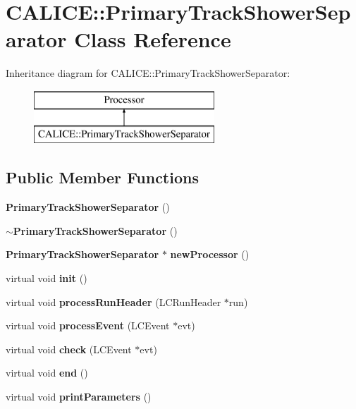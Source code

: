 \section{C\-A\-L\-I\-C\-E\-:\-:Primary\-Track\-Shower\-Separator Class Reference}
\label{classCALICE_1_1PrimaryTrackShowerSeparator}
Inheritance diagram for C\-A\-L\-I\-C\-E\-:\-:Primary\-Track\-Shower\-Separator\-:\begin{figure}[H]
\begin{center}
\leavevmode
\includegraphics[height=2.000000cm]{classCALICE_1_1PrimaryTrackShowerSeparator}
\end{center}
\end{figure}
\subsection*{Public Member Functions}
\begin{DoxyCompactItemize}
\item 
{\bf Primary\-Track\-Shower\-Separator} ()
\item 
{\bf $\sim$\-Primary\-Track\-Shower\-Separator} ()
\item 
{\bf Primary\-Track\-Shower\-Separator} $\ast$ {\bfseries new\-Processor} ()\label{classCALICE_1_1PrimaryTrackShowerSeparator_a0c28aa53521cd9f6306751b9ef2f4a55}

\item 
virtual void {\bfseries init} ()\label{classCALICE_1_1PrimaryTrackShowerSeparator_a3ea401e96f08fddcd03ecd3903708703}

\item 
virtual void {\bfseries process\-Run\-Header} (L\-C\-Run\-Header $\ast$run)\label{classCALICE_1_1PrimaryTrackShowerSeparator_a1cfef7e3a39764085f4ac8462fda3dcc}

\item 
virtual void {\bfseries process\-Event} (L\-C\-Event $\ast$evt)\label{classCALICE_1_1PrimaryTrackShowerSeparator_a18b9dbb2f378118f96b5c5e9e708a9dc}

\item 
virtual void {\bfseries check} (L\-C\-Event $\ast$evt)\label{classCALICE_1_1PrimaryTrackShowerSeparator_ac3ac94e821a7851e21b7dc21e7e5d862}

\item 
virtual void {\bfseries end} ()\label{classCALICE_1_1PrimaryTrackShowerSeparator_a59af8af15c584e14c4645b07fab68a54}

\item 
virtual void {\bfseries print\-Parameters} ()\label{classCALICE_1_1PrimaryTrackShowerSeparator_a871bc0ccae1e35399194edeee9ba087e}

\end{DoxyCompactItemize}
